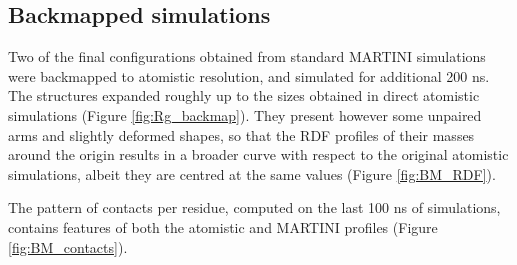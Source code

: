 \subsection{Backmapped simulations} 

Two of the final configurations obtained from standard MARTINI simulations were backmapped to atomistic resolution, and simulated for additional 200 ns. The structures expanded roughly up to the sizes obtained in direct atomistic simulations (Figure \ref{fig:Rg_backmap}). They present however some unpaired arms and slightly deformed shapes, so that the RDF profiles of their masses around the origin results in a broader curve with respect to the original atomistic simulations, albeit they are centred at the same values (Figure \ref{fig:BM_RDF}).

The pattern of contacts per residue, computed on the last 100 ns of simulations, contains features of both the atomistic and MARTINI profiles (Figure \ref{fig:BM_contacts}).
%
